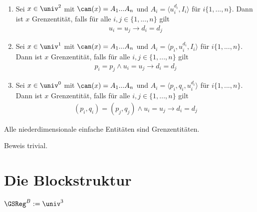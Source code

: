 \begin{dfn}[Grenzentität]\
    \begin{enumerate}
        \item Sei $x \in \univ^2$ mit $\can(x) = A_1 ... A_n$ und $A_i = \langle u_i^{d_i},I_i \rangle$ für $i \{1, ..., n\}$. Dann ist $x$ Grenzentität, falls für alle $i,j \in \{1, ..., n\}$ gilt
            \begin{align*}
                u_i = u_j \to d_i = d_j
            \end{align*}
        \item Sei $x \in \univ^1$ mit $\can(x) = A_1 ... A_n$ und $A_i = \langle p_i,u_i^{d_i},I_i \rangle$ für $i \{1, ..., n\}$. Dann ist $x$ Grenzentität, falls für alle $i,j \in \{1, ..., n\}$ gilt
            \begin{align*}
                p_i = p_j \land u_i = u_j \to d_i = d_j
            \end{align*}
        \item Sei $x \in \univ^0$ mit $\can(x) = A_1 ... A_n$ und $A_i = \langle p_i,q_i,u_i^{d_i} \rangle$ für $i \{1, ..., n\}$. Dann ist $x$ Grenzentität, falls für alle $i,j \in \{1, ..., n\}$ gilt
            \begin{align*}
                (p_i, q_i) = (p_j,q_j) \land u_i = u_j \to d_i = d_j
            \end{align*}
    \end{enumerate}
\end{dfn}

\begin{satz}\label{satz:einfachgrenze}
    Alle niederdimensionale einfache Entitäten sind Grenzentitäten.
\end{satz}
Beweis trivial.



\section{Die Blockstruktur}


\begin{dfn}[$\GSReg$]
    $\GSReg^B := \univ^3$
\end{dfn}


